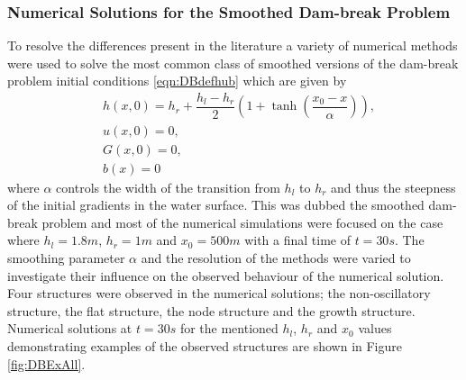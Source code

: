 \subsubsection{Numerical Solutions for the Smoothed Dam-break Problem}
To resolve the differences present in the literature a variety of numerical methods were used to solve the most common class of smoothed versions of the dam-break problem initial conditions \eqref{eqn:DBdefhub} which are given by
\begin{subequations}
	\begin{align}
	&h(x,0) = h_r + \dfrac{h_l - h_r}{2} \left(1 +  \tanh\left(\dfrac{x_0 - x}{\alpha}\right) \right), \\
	&u(x,0) = 0 , \\
	&G(x,0) = 0 , \\
	&b(x) = 0
	\end{align}
	\label{eqn:SDBdefhub}
\end{subequations} 
where $\alpha$ controls the width of the transition from $h_l$ to $h_r$ and thus the steepness of the initial gradients in the water surface. This was dubbed the smoothed dam-break problem and most of the numerical simulations were focused on the case where $h_l = 1.8m$, $h_r = 1m$ and $x_0 = 500m$ with a final time of $t=30s$. The smoothing parameter $\alpha$ and the resolution of the methods were varied to investigate their influence on the observed behaviour of the numerical solution. Four structures were observed in the numerical solutions; the non-oscillatory structure, the flat structure, the node structure and the growth structure. Numerical solutions at $t=30s$ for the mentioned $h_l$, $h_r$ and $x_0$ values demonstrating examples of the observed structures are shown in Figure \ref{fig:DBExAll}. 
